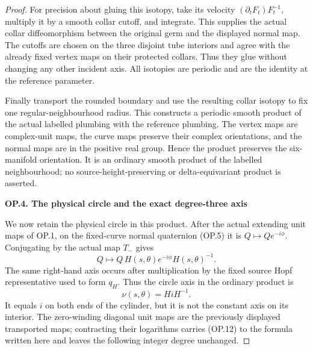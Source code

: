 \begin{proof}
For precision about gluing this isotopy, take its velocity
\((\partial_tF_t)F_t^{-1}\), multiply it by a smooth collar cutoff,
and integrate. This supplies the actual collar diffeomorphism
between the original germ and the displayed normal map. The cutoffs
are chosen on the three disjoint tube interiors and agree with the
already fixed vertex maps on their protected collars. Thus they
glue without changing any other incident axis. All isotopies are
periodic and are the identity at the reference parameter.

Finally transport the rounded boundary and use the resulting collar
isotopy to fix one regular-neighbourhood radius. This constructs a
periodic smooth product of the actual labelled plumbing with the
reference plumbing. The vertex maps are complex-unit maps, the
curve maps preserve their complex orientations, and the normal maps
are in the positive real group. Hence the product preserves the
six-manifold orientation. It is an ordinary smooth product of the
labelled neighbourhood; no source-height-preserving or
delta-equivariant product is asserted.

\par

\medskip\noindent\textbf{OP.4. The physical circle and the exact degree-three axis}

\par\nobreak

We now retain the physical circle in this product. After the actual
extending unit maps of OP.1, on the fixed-curve normal quaternion
(OP.5) it is \(Q\mapsto Qe^{-i\phi}\). Conjugating by the actual
map \(T_-\) gives
\[
       Q\longmapsto Q\,H(s,\theta)e^{-i\phi}H(s,\theta)^{-1}.
                                                               \tag{OP.12}
\]
The same right-hand axis occurs after multiplication by the fixed
source Hopf representative used to form \(q_H\). Thus the circle
axis in the ordinary product is
\[
                         \nu(s,\theta)=H iH^{-1}.     \tag{OP.13}
\]
It equals \(i\) on both ends of the cylinder, but it is not the
constant axis on its interior. The zero-winding diagonal unit maps
are the previously displayed transported maps; contracting their
logarithms carries (OP.12) to the formula written here and leaves
the following integer degree unchanged.


\end{proof}
